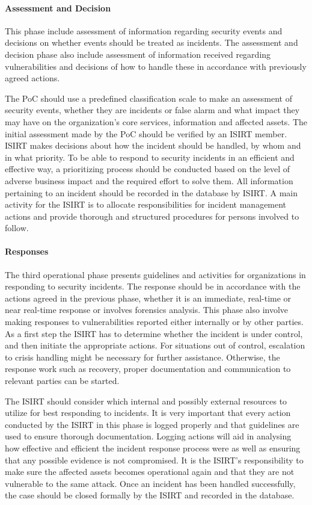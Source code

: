 \paragraph{Assessment and Decision} This phase include assessment of information regarding security events and decisions on whether events should be treated as incidents. The assessment and decision phase also include assessment of information received regarding vulnerabilities and decisions of how to handle these in accordance with previously agreed actions.

The PoC should use a predefined classification scale to make an assessment of security events, whether they are incidents or false alarm and what impact they may have on the organization's core services, information and affected assets. The initial assessment made by the PoC should be verified by an ISIRT member. ISIRT makes decisions about how the incident should be handled, by whom and in what priority. To be able to respond to security incidents in an efficient and effective way, a prioritizing process should be conducted based on the level of adverse business impact and the required effort to solve them.  All information pertaining to an incident should be recorded in the database by ISIRT. A main activity for the ISIRT is to allocate responsibilities for incident management actions and provide thorough and structured procedures for persons involved to follow. 

\paragraph{Responses} The third operational phase presents guidelines and activities for organizations in responding to security incidents. The response should be in accordance with the actions agreed in the previous phase, whether it is an immediate, real-time or near real-time response or involves forensics analysis. This phase also involve making responses to vulnerabilities reported either internally or by other parties. As a first step the ISIRT has to determine whether the incident is under control, and then initiate the appropriate actions. For situations out of control, escalation to crisis handling might be necessary for further assistance. Otherwise, the response work such as recovery, proper documentation and communication to relevant parties can be started. 

The ISIRT should consider which internal and possibly external resources to utilize for best responding to incidents. It is very important that every action conducted by the ISIRT in this phase is logged properly and that guidelines are used to ensure thorough documentation. Logging actions will aid in analysing how effective and efficient the incident response process were as well as ensuring that any possible evidence is not compromised. It is the ISIRT's responsibility to make sure the affected assets becomes operational again and that they are not vulnerable to the same attack. Once an incident has been handled successfully, the case should be closed formally by the ISIRT and recorded in the database.


